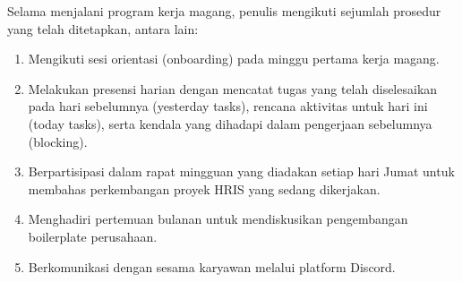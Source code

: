 Selama menjalani program kerja magang, penulis mengikuti sejumlah prosedur 
yang telah ditetapkan, antara lain:

\begin{enumerate}
    \item Mengikuti sesi orientasi (onboarding) pada minggu pertama kerja magang.
    \item Melakukan presensi harian dengan mencatat tugas yang telah diselesaikan 
    pada hari sebelumnya (yesterday tasks), rencana aktivitas untuk hari ini 
    (today tasks), serta kendala yang dihadapi dalam pengerjaan sebelumnya (blocking).
    \item Berpartisipasi dalam rapat mingguan yang diadakan setiap hari Jumat 
    untuk membahas perkembangan proyek HRIS yang sedang dikerjakan.
    \item Menghadiri pertemuan bulanan untuk mendiskusikan pengembangan 
    boilerplate perusahaan.
    \item Berkomunikasi dengan sesama karyawan melalui platform Discord.
\end{enumerate}
